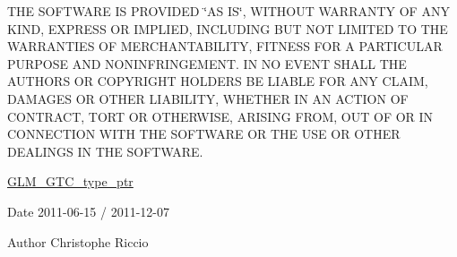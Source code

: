 T\+H\+E S\+O\+F\+T\+W\+A\+R\+E I\+S P\+R\+O\+V\+I\+D\+E\+D \char`\"{}\+A\+S I\+S\char`\"{}, W\+I\+T\+H\+O\+U\+T W\+A\+R\+R\+A\+N\+T\+Y O\+F A\+N\+Y K\+I\+N\+D, E\+X\+P\+R\+E\+S\+S O\+R I\+M\+P\+L\+I\+E\+D, I\+N\+C\+L\+U\+D\+I\+N\+G B\+U\+T N\+O\+T L\+I\+M\+I\+T\+E\+D T\+O T\+H\+E W\+A\+R\+R\+A\+N\+T\+I\+E\+S O\+F M\+E\+R\+C\+H\+A\+N\+T\+A\+B\+I\+L\+I\+T\+Y, F\+I\+T\+N\+E\+S\+S F\+O\+R A P\+A\+R\+T\+I\+C\+U\+L\+A\+R P\+U\+R\+P\+O\+S\+E A\+N\+D N\+O\+N\+I\+N\+F\+R\+I\+N\+G\+E\+M\+E\+N\+T. I\+N N\+O E\+V\+E\+N\+T S\+H\+A\+L\+L T\+H\+E A\+U\+T\+H\+O\+R\+S O\+R C\+O\+P\+Y\+R\+I\+G\+H\+T H\+O\+L\+D\+E\+R\+S B\+E L\+I\+A\+B\+L\+E F\+O\+R A\+N\+Y C\+L\+A\+I\+M, D\+A\+M\+A\+G\+E\+S O\+R O\+T\+H\+E\+R L\+I\+A\+B\+I\+L\+I\+T\+Y, W\+H\+E\+T\+H\+E\+R I\+N A\+N A\+C\+T\+I\+O\+N O\+F C\+O\+N\+T\+R\+A\+C\+T, T\+O\+R\+T O\+R O\+T\+H\+E\+R\+W\+I\+S\+E, A\+R\+I\+S\+I\+N\+G F\+R\+O\+M, O\+U\+T O\+F O\+R I\+N C\+O\+N\+N\+E\+C\+T\+I\+O\+N W\+I\+T\+H T\+H\+E S\+O\+F\+T\+W\+A\+R\+E O\+R T\+H\+E U\+S\+E O\+R O\+T\+H\+E\+R D\+E\+A\+L\+I\+N\+G\+S I\+N T\+H\+E S\+O\+F\+T\+W\+A\+R\+E.

\hyperlink{group__gtc__type__ptr}{G\+L\+M\+\_\+\+G\+T\+C\+\_\+type\+\_\+ptr}

\begin{DoxyDate}{Date}
2011-\/06-\/15 / 2011-\/12-\/07 
\end{DoxyDate}
\begin{DoxyAuthor}{Author}
Christophe Riccio 
\end{DoxyAuthor}
